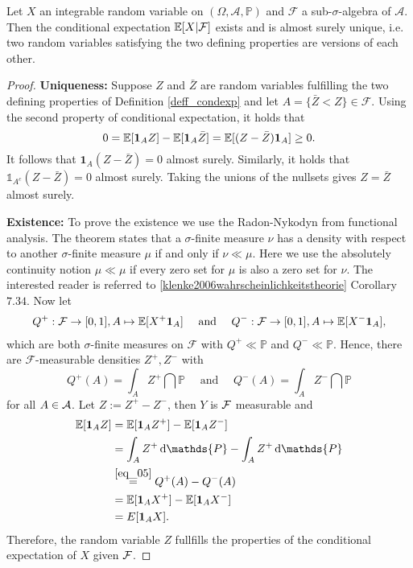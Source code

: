 \begin{lsatzwichtig}
\begin{theorem}\label{existenceCE}
	Let $X$ an integrable random variable on $(\Omega, \mathcal A, \mathbb P)$ and $\mathcal F$ a sub-$\sigma$-algebra of $\mathcal A$. Then the conditional expectation $\mathbb{E}[X|\mathcal F]$ exists and is almost surely unique, i.e. two random variables satisfying the two defining properties are versions of each other.
\end{theorem}
\end{lsatzwichtig}
\begin{proof}[Proof]
	\textbf{Uniqueness:} Suppose $Z$ and $\bar Z$ are random variables fulfilling the two defining properties of Definition \ref{deff_condexp} and let $A=\{\bar Z<Z\}\in\mathcal{F}.$ Using the second property of conditional expectation, it holds that 
	$$0=\mathbb{E}[\mathbf{1}_AZ]-\mathbb{E}[\mathbf{1}_A\bar{Z}]=\mathbb{E}[(Z-\bar{Z})\mathbf{1}_A]\ge0.$$ It follows that $\mathbf{1}_A(Z-\bar{Z})=0$ almost surely. Similarly, it holds that $\mathds{1}_{A^c}(Z-\bar{Z})=0$ almost surely. Taking the unions of the nullsets gives $Z=\bar Z$ almost surely.\smallskip
	
	\textbf{Existence:} To prove the existence we use the Radon-Nykodyn from functional analysis. The theorem states that a $\sigma$-finite measure $\nu$ has a density with respect to another $\sigma$-finite measure $\mu$ if and only if $\nu\ll \mu$. Here we use the absolutely continuity notion $\mu\ll \mu$ if every zero set for $\mu$ is also a zero set for $\nu$. The interested reader is referred to \ref{klenke2006wahrscheinlichkeitstheorie} Corollary $7.34$. Now let 
	\begin{align}\label{eq_05}
		Q^+:\mathcal{F}\to[0,1],A\mapsto\mathbb{E}[X^+\mathbf{1}_A]\quad\text{ and }\quad Q^-:\mathcal{F}\to[0,1],A\mapsto\mathbb{E}[X^-\mathbf{1}_A],
	\end{align}
	which are both $\sigma$-finite measures on $\mathcal F$ with $Q^+\ll \mathbb P$ and $Q^-\ll \mathbb P$. Hence, there are $\mathcal{F}$-measurable densities $Z^+,Z^-$ with $$Q^+(A)=\int_A Z^+\dint\mathds{P}\quad \text{ and }\quad Q^-(A)=\int_A Z^-\dint\mathds{P}$$ for all $A\in\mathcal{A}$. Let $Z:=Z^+-Z^-$, then $Y$ is $\mathcal{F}$ measurable and 
	\begin{align*}
		\E[\mathbf{1}_AZ]&=\E[\mathbf{1}_AZ^+]-\E[\mathbf{1}_AZ^-]\\
		&=\int_AZ^+\dint\mathds{P}-\int_AZ^+\dint\mathds{P}\\
		&\overset{\eqref{eq_05}}=Q^+(A)-Q^-(A)\\
		&=\E[\mathbf{1}_AX^+]-\E[\mathbf{1}_AX^-]\\
		&=E[\mathbf{1}_AX].
	\end{align*}
	Therefore, the random variable $Z$ fullfills the properties of the conditional expectation of $X$ given $\mathcal{F}$.
\end{proof}
	\marginpar{\textcolor{red}{Lecture 2}}



